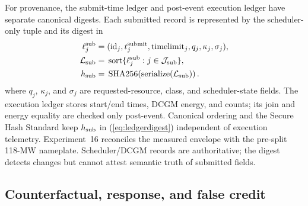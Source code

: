 \documentclass[10pt,journal]{IEEEtran}
\begin{document}
For provenance, the submit-time ledger and post-event execution ledger have
separate canonical digests. Each submitted record is represented by the
scheduler-only tuple and its digest in
\begin{equation}
\begin{aligned}
 \ell_j^{\rm sub}={}&(\mathrm{id}_j,t_j^{\rm submit},\mathrm{timelimit}_j,
 q_j,\kappa_j,\sigma_j),\\
 \mathcal L_{\rm sub}={}&\operatorname{sort}\{\ell_j^{\rm sub}:j\in\mathcal J_{\rm sub}\},\\
 h_{\rm sub}={}&\operatorname{SHA256}\!\left(\operatorname{serialize}(\mathcal L_{\rm sub})\right).
\end{aligned}
\label{eq:ledgerdigest}
\end{equation}
where $q_j$, $\kappa_j$, and $\sigma_j$ are requested-resource, class, and
scheduler-state fields. The execution ledger stores start/end times, DCGM
energy, and counts; its join and energy equality are checked only post-event.
Canonical ordering and the Secure Hash Standard \cite{nist2015fips1804} keep
$h_{\rm sub}$ in (\ref{eq:ledgerdigest}) independent of execution telemetry.
Experiment~16 reconciles the measured envelope with the pre-split 118-MW
nameplate. Scheduler/DCGM records are authoritative; the digest detects
changes but cannot attest semantic truth of submitted fields.

\subsection{Counterfactual, response, and false credit}
\end{document}
